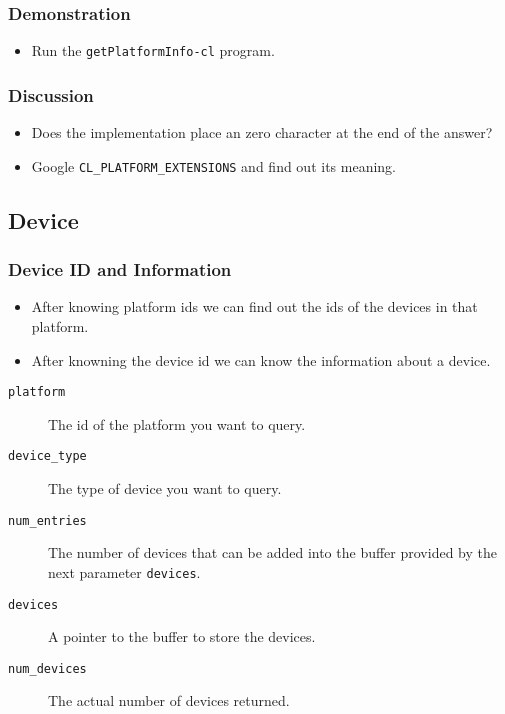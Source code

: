 \documentclass{beamer}
\begin{document}
\begin{frame}
  \frametitle{Demonstration}
  \begin{itemize}
  \item Run the {\tt getPlatformInfo-cl} program.
  \end{itemize}
\end{frame}

\begin{frame}
  \frametitle{Discussion}
  \begin{itemize}
  \item Does the implementation place an zero character at the end of
    the answer?
  \item Google {\tt CL\_PLATFORM\_EXTENSIONS} and find out its
    meaning.
  \end{itemize}
\end{frame}

\subsection{Device}

\begin{frame}
  \frametitle{Device ID and Information}
  \begin{itemize}
    \item After knowing platform ids we can find out the ids of the
      devices in that platform.
    \item After knowning the device id we can know the information
      about a device.
  \end{itemize}
\end{frame}

\begin{frame}
\end{frame}

\begin{frame}
  \begin{description}
  \item [\tt platform] The id of the platform you want to query.
  \item [\tt device\_type] The type of device you want to query.
  \item [\tt num\_entries] The number of devices that can be added into
    the buffer provided by the next parameter {\tt devices}.
  \item [\tt devices] A pointer to the buffer to store the devices.
  \item [\tt num\_devices] The actual number of devices returned.
  \end{description}
\end{frame}
\end{document}
